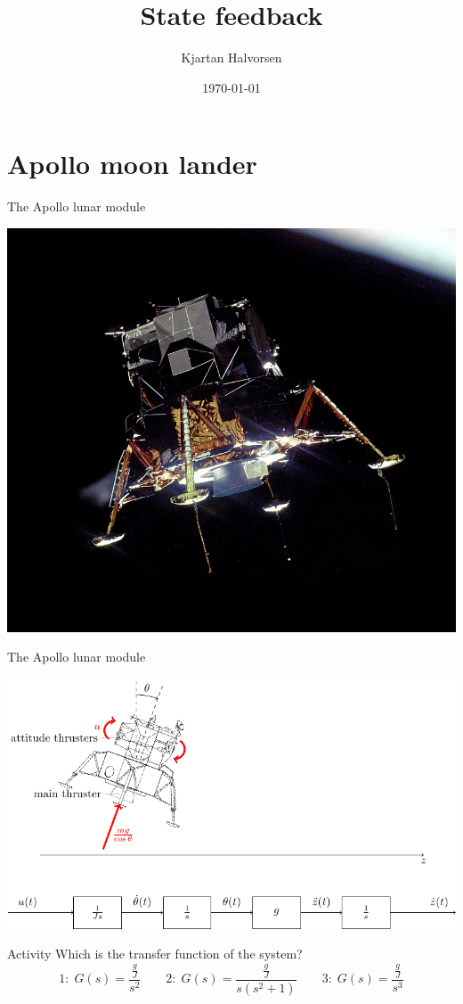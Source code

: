 \documentclass[presentation,aspectratio=169]{beamer}
\author{Kjartan Halvorsen}
\date{\today}
\title{State feedback}
\begin{document}
\maketitle



\section{Apollo moon lander}
\label{sec:org5cc8e2d}

\begin{frame}[label={sec:org837b1f6}]{The Apollo lunar module}
\begin{center}
  \includegraphics[width=0.5\linewidth]{../../figures/Apollo_11_Lunar_Module.jpg}
\end{center}
\end{frame}

\begin{frame}[label={sec:org250657c}]{The Apollo lunar module}
\begin{center}
\includegraphics[width=0.7\linewidth]{../../figures/fig-apollo}
\end{center}

\pause

\alert{Activity} Which is the transfer function of the system?
   \[1: \; G(s) = \frac{\frac{g}{J} }{s^2}\qquad 2: \; G(s) = \frac{\frac{g}{J} }{s(s^2 + 1)} \qquad 3: \; G(s) = \frac{\frac{g}{J} }{s^3}\]
\end{frame}
\end{document}
